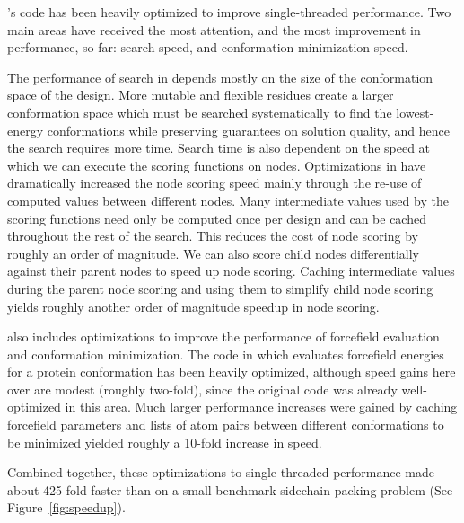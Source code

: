 's code has been heavily optimized to improve single-threaded performance. Two main areas have received the most attention, and the most improvement in performance, so far: \as search speed, and conformation minimization speed.

The performance of \as search in \osprey depends mostly on the size of the conformation space of the design. More mutable and flexible residues create a larger conformation space which must be searched systematically to find the lowest-energy conformations while preserving guarantees on solution quality, and hence the search requires more time. Search time is also dependent on the speed at which we can execute the scoring functions on \as nodes. Optimizations in  have dramatically increased the \as node scoring speed mainly through the re-use of computed values between different nodes. Many intermediate values used by the \as scoring functions need only be computed once per design and can be cached throughout the rest of the search. This reduces the cost of node scoring by roughly an order of magnitude. We can also score child nodes differentially against their parent nodes to speed up node scoring. Caching intermediate values during the parent node scoring and using them to simplify child node scoring yields roughly another order of magnitude speedup in \as node scoring. %

 also includes optimizations to improve the performance of forcefield evaluation and conformation minimization. The code in  which evaluates forcefield energies for a protein conformation has been heavily optimized, although speed gains here over  are modest (roughly two-fold), since the original code was already well-optimized in this area. Much larger performance increases were gained by caching forcefield parameters and lists of atom pairs between different conformations to be minimized yielded roughly a 10-fold increase in speed. %

Combined together, these optimizations to single-threaded performance made  about 425-fold faster than  on a small benchmark sidechain packing problem (See Figure~\ref{fig:speedup}).

